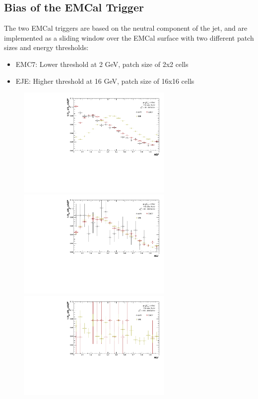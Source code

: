 \documentclass[ALICE]{ALICE_analysis_notes}
\begin{document}
\subsection{Bias of the EMCal Trigger}
\label{sec:EMCTriggerBias}

The two EMCal triggers are based on the neutral component of the jet, and are implemented as a sliding window over the EMCal surface with two different patch sizes and energy thresholds:

\begin{itemize}
    \item EMC7: Lower threshold at 2 GeV, patch size of 2x2 cells
    \item EJE: Higher threshold at 16 GeV, patch size of 16x16 cells
\end{itemize}

\begin{figure}[h!]
    \centering
    \begin{multicols}{2}
            \includegraphics[width=7.5cm]{figures/NEF/All/hNEF_20-30GeV_R02.pdf}
            \includegraphics[width=7.5cm]{figures/NEF/All/hNEF_60-100GeV_R02.pdf}
            \includegraphics[width=7.5cm]{figures/NEF/All/hNEF_160-240GeV_R02.pdf}

\end{multicols}
\end{figure}
\end{document}
